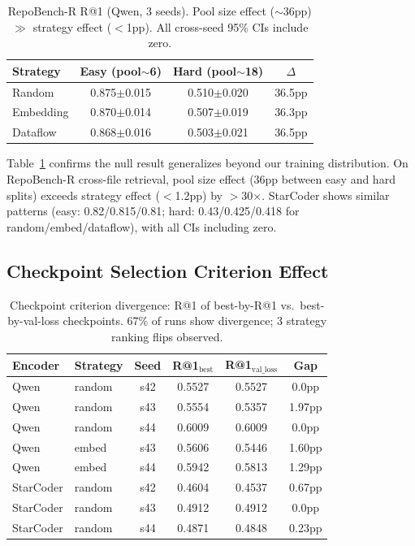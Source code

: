 \documentclass[11pt,a4paper]{article}
\begin{document}
\begin{table}[t]
\centering
\small
\begin{tabular}{lccc}
\toprule
Strategy & Easy (pool$\sim$6) & Hard (pool$\sim$18) & $\Delta$ \\
\midrule
Random & 0.875$\pm$0.015 & 0.510$\pm$0.020 & 36.5pp \\
Embedding & 0.870$\pm$0.014 & 0.507$\pm$0.019 & 36.3pp \\
Dataflow & 0.868$\pm$0.016 & 0.503$\pm$0.021 & 36.5pp \\
\bottomrule
\end{tabular}
\caption{RepoBench-R R@1 (Qwen, 3 seeds). Pool size effect ($\sim$36pp) $\gg$ strategy effect ($<$1pp). All cross-seed 95\% CIs include zero.}
\label{tab:repobench}
\end{table}

Table~\ref{tab:repobench} confirms the null result generalizes beyond our training distribution.
On RepoBench-R cross-file retrieval, pool size effect (36pp between easy and hard splits) exceeds strategy effect ($<$1.2pp) by $>$30$\times$.
StarCoder shows similar patterns (easy: 0.82/0.815/0.81; hard: 0.43/0.425/0.418 for random/embed/dataflow), with all CIs including zero.

\subsection{Checkpoint Selection Criterion Effect}

\begin{table}[t]
\centering
\small
\begin{tabular}{llcccc}
\toprule
Encoder & Strategy & Seed & R@1$_\text{best}$ & R@1$_\text{val\_loss}$ & Gap \\
\midrule
Qwen & random & s42 & 0.5527 & 0.5527 & 0.0pp \\
Qwen & random & s43 & 0.5554 & 0.5357 & 1.97pp \\
Qwen & random & s44 & 0.6009 & 0.6009 & 0.0pp \\
Qwen & embed & s43 & 0.5606 & 0.5446 & 1.60pp \\
Qwen & embed & s44 & 0.5942 & 0.5813 & 1.29pp \\
StarCoder & random & s42 & 0.4604 & 0.4537 & 0.67pp \\
StarCoder & random & s43 & 0.4912 & 0.4912 & 0.0pp \\
StarCoder & random & s44 & 0.4871 & 0.4848 & 0.23pp \\
\bottomrule
\end{tabular}
\caption{Checkpoint criterion divergence: R@1 of best-by-R@1 vs.\ best-by-val-loss checkpoints. 67\% of runs show divergence; 3 strategy ranking flips observed.}
\label{tab:checkpoint}
\end{table}
\end{document}

